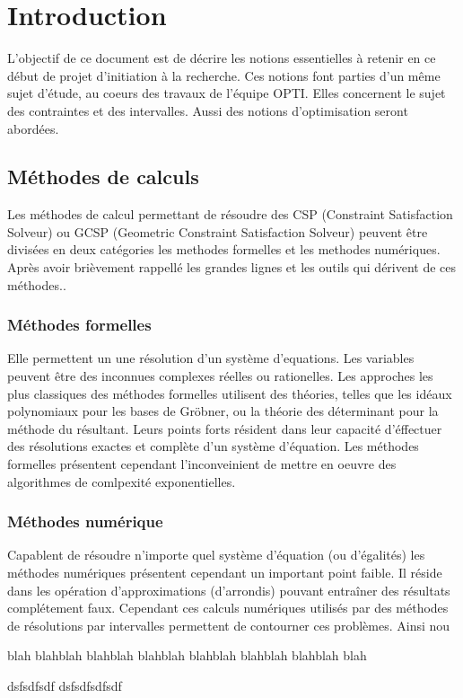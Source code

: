 \chapter{Introduction}
L'objectif de ce document est de décrire les notions essentielles à retenir en ce début de projet d'initiation à la recherche. Ces notions font parties d'un même sujet d'étude, au coeurs des travaux de l'équipe OPTI. Elles concernent le sujet des contraintes et des intervalles. Aussi des notions d'optimisation seront abordées.

\section{Méthodes de calculs}
Les méthodes de calcul permettant de résoudre des CSP (Constraint Satisfaction Solveur) ou GCSP (Geometric Constraint Satisfaction Solveur) peuvent être divisées en deux catégories les methodes formelles et les methodes numériques. Après avoir brièvement rappellé les grandes lignes et les outils qui dérivent de ces méthodes..

\subsection{Méthodes formelles}
Elle permettent un une résolution d'un système d'equations. Les variables peuvent être des inconnues complexes réelles ou rationelles. Les approches les plus classiques des méthodes formelles utilisent des théories, telles que les idéaux polynomiaux pour les bases de Gröbner, ou la théorie des déterminant pour la méthode du résultant.  Leurs points forts résident dans leur capacité d'éffectuer des résolutions exactes et complète d'un système d'équation. Les méthodes formelles présentent cependant l'inconveinient de mettre en oeuvre des algorithmes de comlpexité exponentielles.

\subsection{Méthodes numérique}
Capablent de résoudre n'importe quel système d'équation (ou d'égalités) les méthodes numériques présentent cependant un important point faible. Il réside dans les opération d'approximations (d'arrondis)  pouvant entraîner des résultats complétement faux. Cependant ces calculs numériques utilisés  par des méthodes de résolutions par intervalles permettent de contourner ces problèmes. Ainsi nou


blah blahblah blahblah \cite{Jermann} blahblah blahblah blahblah\cite{Goldsztejn} blahblah blah  \cite{Goualard}


dsfsdfsdf\cite{Schichl} dsfsdfsdfsdf \cite{Neumaier}
